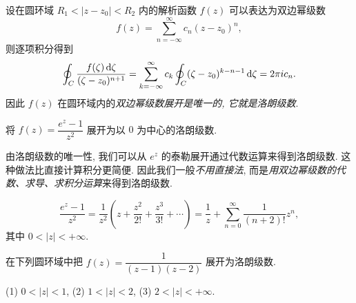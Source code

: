 \documentclass[nocolor,theme=doremi,lang=cn,11pt,chinese,twoside,openright,usesamecnt]{elegantbook}
\newcommand\enumnum[1]{{\mdseries\upshape\textcolor[rgb]{.2,.2,.7}{(#1)}}}
\begin{document}
设在圆环域 $R_1<|z-z_0|<R_2$ 内的解析函数 $f(z)$ 可以表达为双边幂级数
\[f(z)=\sum_{n=-\infty}^\infty c_n(z-z_0)^n,\]
则逐项积分得到
\[\oint_C\frac{f(\zeta)\,\mathrm{d}\zeta}{(\zeta-z_0)^{n+1}}=\sum_{k=-\infty}^\infty c_k\oint_C(\zeta-z_0)^{k-n-1}\,\mathrm{d}\zeta=2\pi i c_n.\]
因此 $f(z)$ 在圆环域内的\emph{双边幂级数展开是唯一的, 它就是洛朗级数}.

\begin{example}
	将 $f(z)=\dfrac{e^z-1}{z^2}$ 展开为以 $0$ 为中心的洛朗级数.
\end{example}

由洛朗级数的唯一性, 我们可以从 $e^z$ 的泰勒展开通过代数运算来得到洛朗级数.
这种做法比直接计算积分更简便.
因此我们一般\emph{不用直接法}, 而是\emph{用双边幂级数的代数、求导、求积分运算}来得到洛朗级数.

\begin{solution}
	\[\frac{e^z-1}{z^2}=\frac1{z^2}\left(z+\frac{z^2}{2!}+\frac{z^3}{3!}+\cdots\right)
	{=\frac1z+\sum_{n=0}^\infty \frac1{(n+2)!}z^n,}\]
	{其中 $0<|z|<+\infty$.}
\end{solution}

\begin{example}
	在下列圆环域中把 $f(z)=\dfrac1{(z-1)(z-2)}$ 展开为洛朗级数.

	{\enumnum1 $0<|z|<1$, \enumnum2 $1<|z|<2$, \enumnum3 $2<|z|<+\infty$.}
\end{example}
\end{document}
